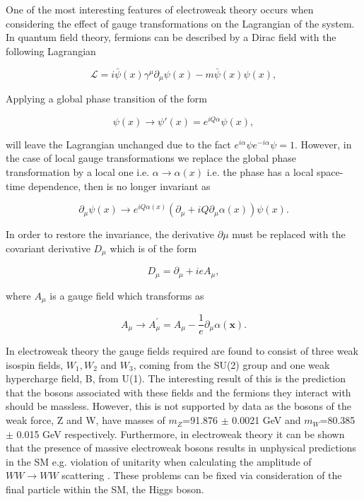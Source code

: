 One of the most interesting features of electroweak theory occurs when considering the effect of gauge transformations on the Lagrangian of the system. In quantum field theory, fermions can be described by a Dirac field with the following Lagrangian\cite{Pich:2005mk}

\begin{equation}
  \label{eq:diracLagrangian}
\mathscr{L}=i\bar{\psi}(x) \gamma^{\mu} \partial{_\mu} \psi(x)  -m\bar{\psi}(x)\psi(x),
\end{equation}

Applying a global phase transition of the form

\begin{equation}
\psi(x) \rightarrow \psi '(x) = e^{iQ\alpha}\psi(x),
\end{equation}

will leave the Lagrangian unchanged due to the fact $e^{i\alpha}\psi e^{-i\alpha}\psi=1$. However, in the case of local gauge transformations we replace the global phase transformation by a local one i.e. $\alpha \rightarrow\alpha(x) $ i.e. the phase has a local space-time dependence, then  is no longer invariant as

\begin{equation}
  \partial{_\mu} \psi(x)\rightarrow e^{iQ\alpha(x)} (\partial{_\mu} + iQ\partial{_\mu}\alpha(x)) \psi(x).
\end{equation}

In order to restore the invariance, the derivative $\partial{\mu}$ must be replaced with the covariant derivative $D_{\mu}$ which is of the form

\begin{equation}
  D_{\mu}=\partial{_\mu}+ieA_{\mu},
\end{equation}

where $A_{\mu}$ is a gauge field which transforms as

\begin{equation}
  A_{\mu}\rightarrow A_{\mu}^{'} = A_{\mu} - \frac{1}{e}\partial{_\mu}\alpha(\textbf{x}).
\end{equation}

In electroweak theory the gauge fields required are found to consist of three weak isospin fields, $W_1, W_2$ and $W_3$,  coming from the SU(2) group and one weak hypercharge field, B, from U(1). The interesting result of this is the prediction that the bosons associated with these fields and the fermions they interact with should be massless. However, this is not supported by data as the bosons of the weak force, Z and W, have masses of $m_Z$=91.876 $\pm$ 0.0021 GeV and $m_W$=80.385 $\pm$ 0.015 GeV respectively\cite{Patrignani:2016xqp}. Furthermore, in electroweak theory it can be shown that the presence of massive electroweak bosons results in unphysical predictions in the \ac{SM} e.g. violation of unitarity when calculating the amplitude of $WW\rightarrow WW$ scattering \cite{Szleper:2014xxa}. These problems can be fixed via consideration of the final particle within the \ac{SM}, the Higgs boson.

